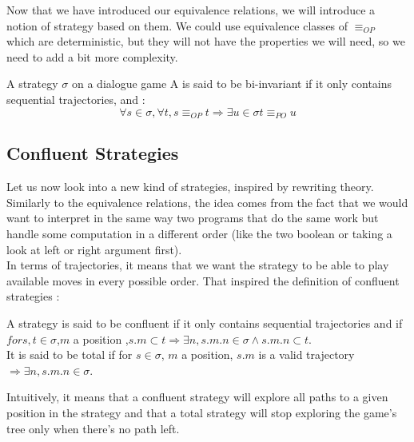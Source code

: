 \documentclass[a4paper,UKenglish]{lipics}
\begin{document}
Now that we have introduced our equivalence relations, we will introduce a notion of strategy based on them. We could use equivalence classes of $\equiv_{OP}$  which are deterministic, but they will not have the properties we will need, so we need to add a bit more complexity.


\begin{definition}
A strategy $\sigma$ on a dialogue game A is said to be bi-invariant if it only contains sequential trajectories, and : $$\forall s \in \sigma,\forall t, s \equiv_{OP} t \Rightarrow \exists u \in \sigma t \equiv_{PO} u$$
\end{definition}


\subsection{Confluent Strategies}
Let us now look into a new kind of strategies, inspired by rewriting theory. Similarly to the equivalence relations,  the idea comes from the fact that we would want to interpret in the same way two programs that do the same work but handle some computation in a different order (like the two boolean or taking a look at left or right argument first).\\ In terms of trajectories, it means that we want the strategy to be able to play available moves in every possible order. That inspired the definition of confluent strategies : 
\begin{definition}
A strategy is said to be confluent if it only contains sequential trajectories and if $for s,t \in \sigma$,$m$ a position ,$ s.m \subset t \Rightarrow \exists n, s.m.n \in \sigma \wedge s.m.n \subset t$.\\
It is said to be total if for $s \in \sigma$, $m$ a position, $s.m$ is a valid trajectory $\Rightarrow \exists n, s.m.n \in \sigma$.
\end{definition}
Intuitively, it means that a confluent strategy will explore all paths to a given position in the strategy and that a total strategy will stop exploring the game's tree only when there's no path left.\\
\end{document}
